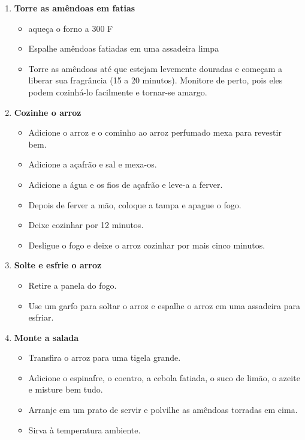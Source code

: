\documentclass [11pt, letterpaper] {article}
\begin{document}
\begin {description}
\begin {enumerate}
\item {\bf Torre as amêndoas em fatias}
\begin {itemize}
\item aqueça o forno a 300 F
\item Espalhe amêndoas fatiadas em uma assadeira limpa
\item Torre as amêndoas até que estejam levemente douradas e começam a liberar sua fragrância (15 a 20 minutos). Monitore de perto, pois eles podem cozinhá-lo facilmente e tornar-se amargo.
\end {itemize}


\item {\bf Cozinhe o arroz}
\begin {itemize}
\item Adicione o arroz e o cominho ao arroz perfumado mexa para revestir bem.
\item Adicione a açafrão e sal e mexa-os.
\item Adicione a água e os fios de açafrão e leve-a a ferver.
\item Depois de ferver a mão, coloque a tampa e apague o fogo.
\item Deixe cozinhar por 12 minutos.
\item Desligue o fogo e deixe o arroz cozinhar por mais cinco minutos.
\end {itemize}

\item {\bf Solte e esfrie o arroz}
\begin {itemize}
\item Retire a panela do fogo.
\item Use um garfo para soltar o arroz e espalhe o arroz em uma assadeira para esfriar.
\end {itemize}

\item {\bf Monte a salada}
\begin {itemize}
\item Transfira o arroz para uma tigela grande.
\item Adicione o espinafre, o coentro, a cebola fatiada, o suco de limão, o azeite e misture bem tudo.
\item Arranje em um prato de servir e polvilhe as amêndoas torradas em cima.
\item Sirva à temperatura ambiente.
\end {itemize}

\end {enumerate}
\end {description}
\end{document}
